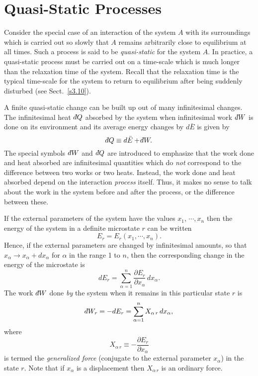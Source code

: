 \section{Quasi-Static Processes}\label{s4.4}
Consider the special case of an interaction of the system $A$ with its surroundings
which is carried out so slowly that $A$ remains arbitrarily close to equilibrium
at all times. Such a process is said to be {\em quasi-static}\/ for
the system $A$. In practice, a quasi-static process must be carried out on
a time-scale which is much longer than the relaxation time of the system. 
Recall
that the relaxation time is the typical time-scale for the  system to return
to equilibrium after being suddenly disturbed (see Sect.~\ref{s3.10}).

A finite quasi-static change can be built up out of many infinitesimal changes.
The infinitesimal heat  $\,\dbar Q$ absorbed by the system when infinitesimal work
$\,\dbar W$ is done on its environment 
and its average energy changes by $d \bar{E}$ is
given by
\begin{equation}
\dbar Q \equiv d\bar{E} + \dbar W.\label{e4.11}
\end{equation}
The special symbols $\,\dbar W$ and $\,\dbar Q$ are introduced to emphasize that the
work done and heat absorbed are infinitesimal quantities which
do {\em not}\/ correspond to the 
difference between two works or two heats. Instead, the work done and heat absorbed
depend on  the interaction {\em process}\/ itself. Thus, it makes no sense to talk
about the work in the system before and after the process, or the difference between
these.

If the external parameters of the system have the values $x_1$, $\cdots, x_n$ then
the energy of the system in a definite microstate $r$ can be written
\begin{equation}
E_r = E_r(x_1,\cdots, x_n).
\end{equation}
Hence, if the external parameters are changed by infinitesimal amounts, so that
$x_\alpha \rightarrow x_\alpha + dx_\alpha$ for $\alpha$ in  the range 1 to $n$, then
the corresponding change in the energy of the microstate is 
\begin{equation}
d E_r = \sum_{\alpha =1}^n \frac{\partial E_r}{\partial x_\alpha}\,dx_\alpha.
\end{equation}
The work $\,\dbar W$ done {\em by}\/ the system when it remains in this particular
state $r$ is 
\begin{equation}
\dbar W_r = - d E_r = \sum_{\alpha=1}^n X_{\alpha\,r}\,dx_\alpha,
\end{equation}
where 
\begin{equation}
X_{\alpha\,r} \equiv -\frac{\partial E_r}{\partial x_\alpha}
\end{equation}
is termed the {\em generalized force}\/ (conjugate to the external parameter $x_\alpha$)
in the state $r$. Note that if $x_\alpha$ is a displacement then $X_{\alpha\,r}$ is
an ordinary force.

